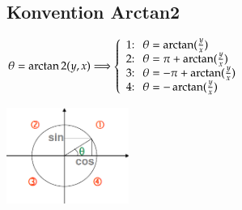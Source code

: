 \subsection{Konvention Arctan2 }
	\begin{minipage}{10cm}
    	$\theta=\arctan2(y,x)\Longrightarrow\left\{
    	\begin{array}{l}
            \text{1:\space\space}\theta=\arctan(\frac{y}{x})\\
			\text{2:\space\space}\theta=\pi+\arctan(\frac{y}{x})\\
			\text{3:\space\space}\theta=-\pi+\arctan(\frac{y}{x})\\
			\text{4:\space\space}\theta=-\arctan(\frac{y}{x})\\
		\end{array}\right.$
    \end{minipage}
	\begin{minipage}{10cm}
    \includegraphics[width=4cm]{./bilder/einheitskreis.png}
    \end{minipage}

